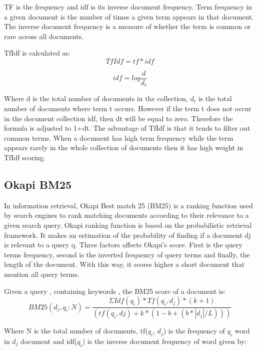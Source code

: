 TF is the frequency and idf is its inverse document frequency. Term frequency in a given document is the number of times a given term appears in that document. The inverse document frequency is a measure of whether the term is common or rare across all documents.

TfIdf  is calculated as:
\begin{equation}
	TfIdf = tf * idf
\end{equation}

\begin{equation}
	idf = log \frac{ d }{ d_t}
\end{equation}

Where d is the total number of documents in the collection, $d_t$ is the  total number of documents where term t occurs. However if the term t does not occur in the document collection idf, then dt will be equal to zero. Therefore the formula is adjusted to 1+dt. The advantage of TfIdf is that it tends to filter out common terms. When a document has high term frequency while the term appears rarely in the whole collection of documents then it has high weight in TfIdf scoring.


\subsection{Okapi BM25}

In information retrieval, Okapi Best match 25 (BM25)  is a ranking function used by search engines to rank matching documents according to their relevance to a given search query. Okapi ranking function is based on the probabilistic retrieval framework. It makes an estimation of the probability of finding if a document dj is relevant to a query q. Three factors affects Okapi's score. First is the query terms frequency, second is the inverted frequency of query terms and finally, the length of the document. With this way, it scores higher a short document that mention all query terms.

Given a query , containing keywords , the BM25 score of a document is:
\begin{equation}
BM25(d_j,q_i:N) = \frac{ ΣIdf(q_i)*Tf(q_i, d_j)*(k + 1) } { ( tf(q_i, dj)+k* (1-b+(b*|d_j|/L))) }
\end{equation}

Where N is the total number of documents, tf($q_i$, $d_j$) is the frequency of $q_i$ word in $d_j$ document and idf($q_i$) is the inverse document frequency of word given by:

